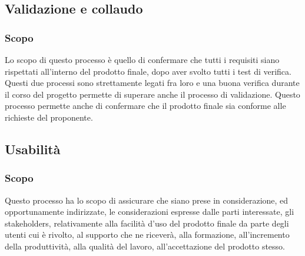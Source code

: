 \subsection{Validazione e collaudo}
\subsubsection{Scopo}
Lo scopo di questo processo è quello di confermare che tutti i requisiti siano rispettati all'interno del prodotto finale, dopo aver svolto tutti i test di verifica. Questi due processi sono strettamente legati fra loro e una buona verifica durante il corso del progetto permette di superare anche il processo di validazione.
Questo processo permette anche di confermare che il prodotto finale sia conforme alle richieste del proponente.

\subsection{Usabilità}
\subsubsection{Scopo}
Questo processo ha lo scopo di assicurare che siano prese in considerazione, ed  opportunamente indirizzate, le considerazioni espresse dalle parti interessate, gli stakeholders, relativamente alla facilità d'uso del prodotto finale da parte degli utenti cui è rivolto, al supporto che ne riceverà, alla formazione, all'incremento della produttività, alla qualità del lavoro, all'accettazione del prodotto stesso. 



